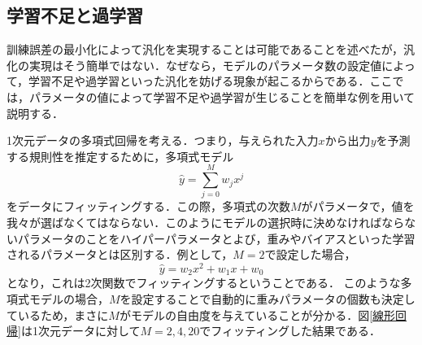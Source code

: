 \documentclass[a4paper,11pt]{jsreport}
\begin{document}
\subsection{学習不足と過学習}
訓練誤差の最小化によって汎化を実現することは可能であることを述べたが，汎化の実現はそう簡単ではない．なぜなら，モデルのパラメータ数の設定値によって，学習不足や過学習といった汎化を妨げる現象が起こるからである．ここでは，パラメータの値によって学習不足や過学習が生じることを簡単な例を用いて説明する．\par
1次元データの多項式回帰を考える．つまり，与えられた入力$x$から出力$y$を予測する規則性を推定するために，多項式モデル
\begin{equation}
  \hat{y} = \sum_{j=0}^M w_j x^j
\end{equation}
をデータにフィッティングする．この際，多項式の次数$M$がパラメータで，値を我々が選ばなくてはならない．このようにモデルの選択時に決めなければならないパラメータのことをハイパーパラメータとよび，重みやバイアスといった学習されるパラメータとは区別する．例として，$M=2$で設定した場合，
\begin{equation}
  \hat{y} = w_2 x^2 + w_1 x + w_0  
\end{equation}
となり，これは2次関数でフィッティングするということである．
このような多項式モデルの場合，$M$を設定することで自動的に重みパラメータの個数も決定しているため，まさに$M$がモデルの自由度を与えていることが分かる．図\ref{線形回帰}は1次元データに対して$M=2, 4, 20$でフィッティングした結果である．
\end{document}
